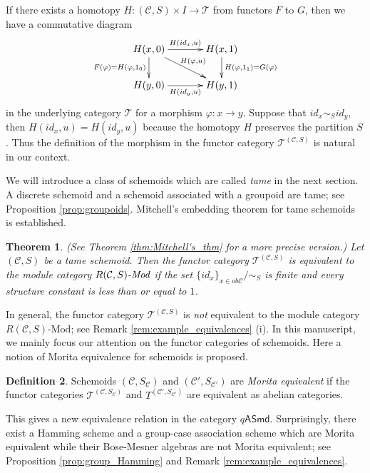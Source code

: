 \documentclass{amsart}
\newtheorem{thm}{Theorem}[section]
\theoremstyle{definition}
\newtheorem{defn}[thm]{Definition}
\theoremstyle{remark}
\newcommand{\K}{R}%
\newcommand{\C}{{\mathcal C}}
\newcommand{\T}{{\mathcal T}}
\begin{document}
If there exists a homotopy $H : (\C, S) \times I \to \T$ from functors 
$F$ to $G$,  then we have a commutative diagram 
$$
\xymatrix@C35pt@R20pt{
{H(x, 0)}  \ar@{->}[r]^{H(id_{x}, u)} \ar[dr]^{H(\varphi,u)}   \ar@{->}[d]_{F(\varphi)=H(\varphi, 1_0)}  &  {H(x, 1)} 
\ar@{->}[d]^{H(\varphi, 1_1)=G(\varphi)}\\
{H(y, 0)} \ar@{->}[r]_{H(id_{y}, u)}  &  {H(y, 1)}
}
$$
in the underlying category $\T$  for a morphism $\varphi : x \to y$. Suppose that $id_x \sim_S id_y$, then 
$H(id_x, u) = H(id_y, u)$ because the homotopy $H$ preserves the partition $S$. 
Thus the definition of the morphism in the functor category $\T^{(\C,S)}$ is natural in our context.  


We will introduce a class of schemoids which are called {\it tame} in the next section. 
A discrete schemoid and a schemoid associated with a groupoid are tame; 
see Proposition \ref{prop:groupoids}. 
Mitchell's embedding theorem for tame schemoids is established.

\begin{thm} {\em (See Theorem \ref{thm:Mitchell's_thm} for a more precise version.)} \label{thm:Mitchell's_thm1} 
Let $(\C, S)$ be a tame schemoid. Then 
the functor category $\T^{(\C, S)}$
is equivalent to the module category $\K(\C, S)\text{\em -Mod}$ if the set $\{id_x\}_{x \in ob \C}/\sim_S$ is finite and 
every structure constant is less than or equal to $1$. 
\end{thm}

In general, the functor category $\T^{(\C, S)}$ is {\it not} equivalent to the module category $\K(\C, S)\text{-Mod}$;
see Remark \ref{rem:example_equivalences} (i). In this manuscript, we mainly focus our attention on the functor categories of 
schemoids. Here a notion of Morita equivalence for schemoids is proposed. 

\begin{defn}
Schemoids $(\C, S_{\C})$ and $(\C', S_{\C'})$ are {\it Morita equivalent} if the functor categories 
$\T^{(\C, S_{\C})}$ and $T^{(\C', S_{\C'})}$ are equivalent as abelian categories.  
\end{defn}

This gives a new equivalence relation in the category $q\mathsf{ASmd}$. 
Surprisingly, there exist a Hamming scheme and a group-case association scheme which are Morita equivalent 
while their Bose-Mesner algebras are not Morita equivalent; see Proposition \ref{prop:group_Hamming} and 
Remark \ref{rem:example_equivalences}.
\end{document}
